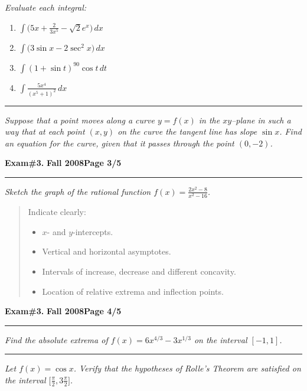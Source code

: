 \documentclass[12pt]{article}
\begin{document}
\bigskip
{\problem[20 pts] \em  Evaluate each integral:} 
\begin{enumerate}
\item $\displaystyle{\int \big( 5x + \frac{2}{3x^5} - \sqrt{2} e^x \big)\, dx}$
\vspace{2cm}
\item $\displaystyle{\int \big( 3\sin x - 2\sec^2 x \big)\, dx}$
\vspace{2cm}
\item $\displaystyle{\int ( 1 + \sin t)^{90} \cos t\, dt}$
\vspace{2cm}
\item $\displaystyle{\int \frac{5x^4}{(x^5+1)^2}\, dx}$
\vspace{3cm}
\end{enumerate}
\hrule
{\problem[10 pts] \em Suppose that a point moves along a curve $y=f(x)$ in the $xy$--plane in such a way that at each point $(x,y)$ on the curve the tangent line has slope $\sin x$.  Find an equation for the curve, given that it passes through the point $(0,-2)$.}
\newpage

\hfill{\large\bf Exam\#3.}\hfill{\large\bf
  Fall 2008}\hfill{\large\bf Page 3/5}\hrule

\bigskip
{\problem[30 pts] \em Sketch the graph of the rational function $f(x) = \displaystyle{\frac{2x^2-8}{x^2-16}}$.}
\begin{quotation}
Indicate clearly:
\begin{itemize}
\item $x$- and $y$-intercepts.
\item Vertical and horizontal asymptotes.
\item Intervals of increase, decrease and different concavity.
\item Location of relative extrema and inflection points. 
\end{itemize}
\end{quotation}
\newpage

\hfill{\large\bf Exam\#3.}\hfill{\large\bf
  Fall 2008}\hfill{\large\bf Page 4/5}\hrule

\bigskip
{\problem[10 pts] \em Find the absolute extrema of $f(x) = 6x^{4/3} - 3x^{1/3}$ on the interval $[-1,1]$.}
\vspace{9cm}
\begin{flushright}
\end{flushright}
\hrule
{\problem[10 pts] \em Let $f(x) = \cos x$. Verify that the hypotheses of Rolle's Theorem are satisfied on the interval $\big[\tfrac{\pi}{2}, 3\tfrac{\pi}{2}\big]$.}
\newpage
\end{document}
